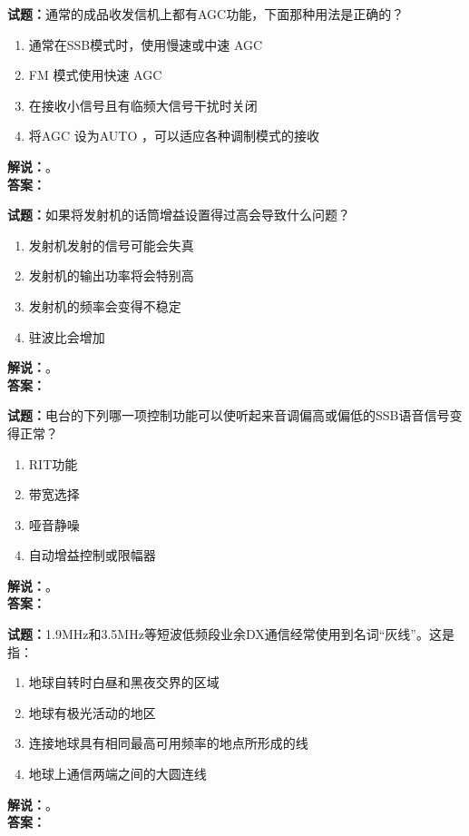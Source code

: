 \documentclass{ctexbook}
\begin{document}
\bigskip

\noindent\textbf{试题：}通常的成品收发信机上都有AGC功能，下面那种用法是正确的？
\begin{enumerate}[leftmargin=3em]
  \item 通常在SSB模式时，使用慢速或中速 AGC
  \item FM 模式使用快速 AGC
  \item 在接收小信号且有临频大信号干扰时关闭
  \item 将AGC 设为AUTO ，可以适应各种调制模式的接收
\end{enumerate}
\noindent\textbf{解说：}\textbf{}。\\\noindent\textbf{答案：}

\bigskip

\noindent\textbf{试题：}如果将发射机的话筒增益设置得过高会导致什么问题？
\begin{enumerate}[leftmargin=3em]
  \item 发射机发射的信号可能会失真
  \item 发射机的输出功率将会特别高
  \item 发射机的频率会变得不稳定
  \item 驻波比会增加
\end{enumerate}
\noindent\textbf{解说：}\textbf{}。\\\noindent\textbf{答案：}

\bigskip

\noindent\textbf{试题：}电台的下列哪一项控制功能可以使听起来音调偏高或偏低的SSB语音信号变得正常？
\begin{enumerate}[leftmargin=3em]
  \item RIT功能
  \item 带宽选择
  \item 哑音静噪
  \item 自动增益控制或限幅器
\end{enumerate}
\noindent\textbf{解说：}\textbf{}。\\\noindent\textbf{答案：}

\bigskip

\noindent\textbf{试题：}1.9\unit{\MHz}和3.5\unit{\MHz}等短波低频段业余DX通信经常使用到名词“灰线”。这是指：
\begin{enumerate}[leftmargin=3em]
  \item 地球自转时白昼和黑夜交界的区域
  \item 地球有极光活动的地区
  \item 连接地球具有相同最高可用频率的地点所形成的线
  \item 地球上通信两端之间的大圆连线
\end{enumerate}
\noindent\textbf{解说：}\textbf{}。\\\noindent\textbf{答案：}
\end{document}

